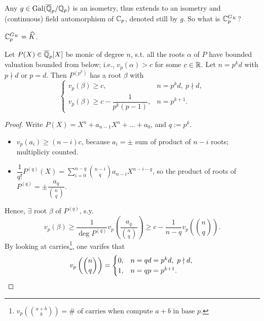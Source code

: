 Any $g\in\operatorname{Gal}(\overline{\mathbb{Q}}_p/\mathbb{Q}_p)$ is an isometry, thus extends to an isometry and (continuous) field automorphism of $\mathbb{C}_p$, denoted still by $g$.
So what is $\mathbb{C}_p^{G_K}$?
\begin{theorem}
    $\mathbb{C}_p^{G_K} = \widehat K$.
\end{theorem}

\begin{lemma}\label{lem: if root bounded from below then root of derivative bounded from below}
    Let $P(X)\in\overline{\mathbb{Q}}_p[X]$ be monic of degree $n$,
    s.t. all the roots $\alpha$ of $P$ have bounded valuation bounded from below; i.e., $v_p(\alpha) > c$ for some $c\in\mathbb{R}$.
    Let $n = p^kd$ with $p\nmid d$ or $p = d$.
    Then $P^{(p^k)}$ has a root $\beta$ with \[\begin{cases}
        v_p(\beta)\ge c, &n = p^kd,\ p\nmid d,\\ 
        v_p(\beta)\ge c - \dfrac{1}{p^k(p-1)},
        &n = p^{k+1}.
    \end{cases}\]
\end{lemma}
\begin{proof}
    Write $P(X) = X^n + a_{n-1}X^n + \dots + a_0$, and $q := p^k$.
    \begin{itemize}
        \item $v_p(a_i)\ge (n-i)c$, because $a_i = \pm$ sum of product of $n - i$ roots; multipliciy counted.
        \item $\dfrac{1}{q!}P^{(q)}(X) = \sum_{i=0}^{n-q}\binom{n-i }{q }a_{n-i }X^{n-i-q}$,
        so the product of roots of $P^{(q)} = \pm\dfrac{a_q }{\binom{n}{q}}$.
    \end{itemize}
    Hence, $\exists$ root $\beta$ of $P^{(q)}$, s.y.\[
        v_p(\beta)\ge \frac{1}{\deg P^{(q)}}v_p\left( \dfrac{a_q }{\binom{n}{q}} \right) \ge c - \frac{1}{n-q}v_p\left( \binom{n}{q} \right).\]
    By looking at carries\footnote{
        $v_p\left( \binom{a + b}{b} \right) = \#\text{ of carries when compute } a + b \text{ in base } p$.
    }, one varifes that \[v_p\left( \binom{n}{q } \right) = \begin{cases}
        0, &n = qd = p^kd,\ p\nmid d,\\ 
        1, &n = qp = p^{k+1}.
    \end{cases}\qedhere\]
\end{proof}

